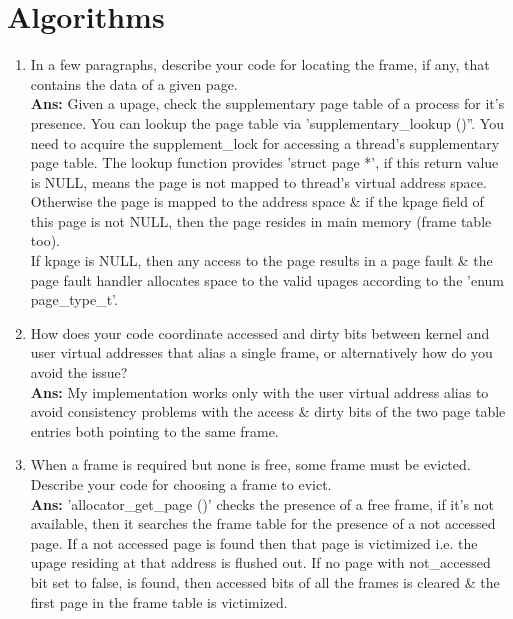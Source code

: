 \documentclass[a4,11pt]{article}
\begin{document}
\section{Algorithms}
\begin{enumerate}
\item In a few paragraphs, describe your code for locating the frame,  if any, that contains the data of a given page.\\
\textbf{Ans:} Given a upage, check the supplementary page table of a process for it's presence. You can lookup the page table via 'supplementary\_lookup ()''. You need to acquire the supplement\_lock for accessing a thread's supplementary page table. The lookup function provides 'struct page *', if this return value is NULL, means the page is not mapped to thread's virtual address space. Otherwise the page is mapped to the address space \& if the kpage field of this page is not NULL, then the page resides in main memory (frame table too). \\
If kpage is NULL, then any access to the page results in a page fault \& the page fault
handler allocates space to the valid upages according to the 'enum page\_type\_t'.

\item How does your code coordinate accessed and dirty bits between  kernel and user virtual addresses that alias a single frame, or alternatively how do you avoid the issue? \\
\textbf{Ans:} My implementation works only with the user virtual address alias to avoid consistency problems with the access \& dirty bits of the two page table entries both pointing to the same frame.

\item When a frame is required but none is free, some frame must be  evicted.  Describe your code for choosing a frame to evict. \\
\textbf{Ans:} 'allocator\_get\_page ()' checks the presence of a free frame, if it's not available, then it searches the frame table for the presence of a not accessed page. If a not accessed page is found then that page is victimized i.e. the upage residing at that address is flushed out. If no page with not\_accessed bit set to false, is found, then accessed bits of all the frames is cleared \& the first page in the frame table is victimized. \\


\end{enumerate}
\end{document}
